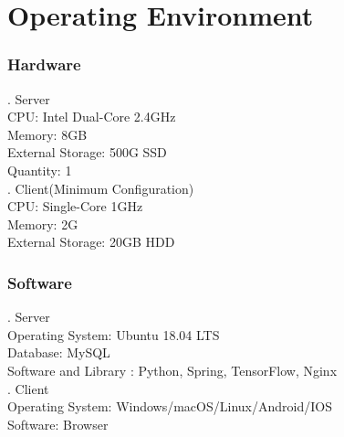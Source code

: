 \documentclass[16pt]{scrreprt}
\begin{document}
 
\section{Operating Environment}

 
\subsubsection{Hardware}

 
. Server\\

 
CPU: Intel Dual-Core 2.4GHz\\

 
Memory: 8GB\\

 
External Storage: 500G SSD\\

 
Quantity: 1\\

 
. Client(Minimum Configuration)\\

 
CPU: Single-Core 1GHz\\

 
Memory: 2G\\

 
External Storage: 20GB HDD\\

 
\subsubsection{Software}

 
. Server\\

 
Operating System: Ubuntu 18.04 LTS\\

 
Database: MySQL\\

 
Software and Library : Python, Spring, TensorFlow, Nginx\\

 
. Client\\

 
Operating System: Windows/macOS/Linux/Android/IOS\\

 
Software: Browser\\
\end{document}
